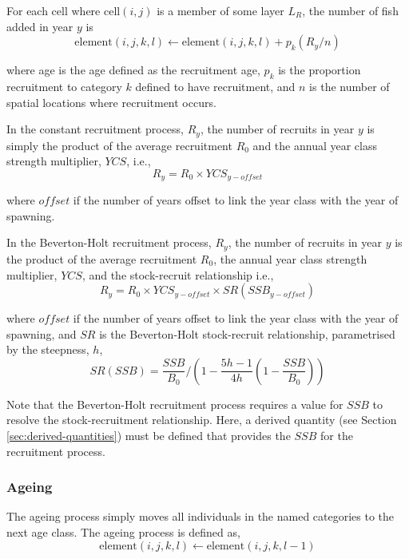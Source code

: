 For each cell where cell$(i,j)$ is a member of some layer $L_R$, the  number of fish added in year $y$ is 
\begin{equation}
  \text{element}(i,j,k,l) \leftarrow \text{element}(i,j,k,l) + p_k(R_y / n)
\end{equation}

where age is the age defined as the recruitment age, $p_k$ is the proportion recruitment to category $k$ defined to have recruitment, and $n$ is the number of spatial locations where recruitment occurs. 

In the constant recruitment process, $R_y$, the number of recruits in year $y$ is simply the product of the average recruitment $R_0$ and the annual year class strength multiplier, $YCS$, i.e.,
\begin{equation}
  R_y = R_0 \times YCS_{y-offset}
\end{equation}

where $offset$ if the number of years offset to link the year class with the year of spawning.

In the Beverton-Holt recruitment process, $R_y$, the number of recruits in year $y$ is the product of the average recruitment $R_0$, the annual year class strength multiplier, $YCS$, and the stock-recruit relationship i.e.,
\begin{equation}
  R_y = R_0 \times YCS_{y-offset} \times SR(SSB_{y-offset})
\end{equation}

where $offset$ if the number of years offset to link the year class with the year of spawning, and $SR$ is the Beverton-Holt stock-recruit relationship, parametrised by the steepness, $h$,
\begin{equation}
SR(SSB) = \frac{SSB}{B_0} / \left( 1-\frac{5h-1}{4h} \left( 1-\frac{SSB}{B_0} \right) \right)
\end{equation}

Note that the Beverton-Holt recruitment process requires a value for $SSB$ to resolve the stock-recruitment relationship. Here, a derived quantity (see Section \ref{sec:derived-quantities}) must be defined that provides the $SSB$ for the recruitment process.

\subsubsection{Ageing\label{sec:ageing}}

The ageing process simply moves all individuals in the named categories to the next age class. The ageing process is defined as,
\begin{equation}
  \text{element}(i,j,k,l) \leftarrow \text{element}(i,j,k,l-1)
\end{equation}

